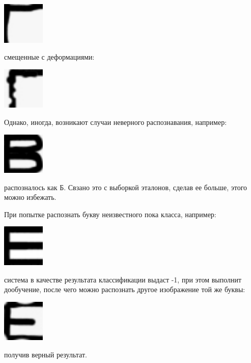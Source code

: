 \begin{center}
	\includegraphics[width=2cm]{image_for_report/sample_g.jpg}
\end{center}

\newpage
смещенные с деформациями:
\begin{center}
	\includegraphics[width=2cm]{image_for_report/sample_g_2.jpg}
\end{center}

Однако, иногда, возникают случаи неверного распознавания, например:
\begin{center}
	\includegraphics[width=2cm]{image_for_report/sample_v.jpg}
\end{center}
распозналось как Б. Свзано это с выборкой эталонов, сделав ее больше, этого можно избежать.


При попытке распознать букву неизвестного пока класса, например:
\begin{center}
	\includegraphics[width=2cm]{image_for_report/sample_e.jpg}
\end{center}
система в качестве результата классификации выдаст -1, при этом выполнит дообучение, после чего можно распознать другое изображение той же буквы:
\begin{center}
	\includegraphics[width=2cm]{image_for_report/sample_e_2.jpg}
\end{center}
получив верный результат.



